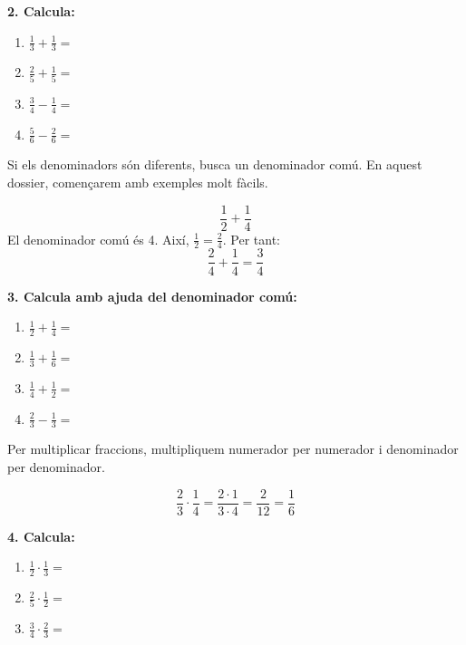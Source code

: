 \documentclass[12pt,a4paper]{article}
\begin{document}
\textbf{2. Calcula:}
\begin{enumerate}[label=\alph*)]
    \item \(\frac{1}{3}+\frac{1}{3}=\) \vspace{0.7cm}
    \item \(\frac{2}{5}+\frac{1}{5}=\) \vspace{0.7cm}
    \item \(\frac{3}{4}-\frac{1}{4}=\) \vspace{0.7cm}
    \item \(\frac{5}{6}-\frac{2}{6}=\) \vspace{0.7cm}
\end{enumerate}

\begin{capsula}
Si els denominadors són diferents, busca un denominador comú. En aquest dossier, començarem amb exemples molt fàcils.
\end{capsula}

\begin{exemple}
\[
\frac{1}{2}+\frac{1}{4}
\]
El denominador comú és 4. Així, \(\frac{1}{2}=\frac{2}{4}\). Per tant:
\[
\frac{2}{4}+\frac{1}{4}=\frac{3}{4}
\]
\end{exemple}

\textbf{3. Calcula amb ajuda del denominador comú:}
\begin{enumerate}[label=\alph*)]
    \item \(\frac{1}{2}+\frac{1}{4}=\) \vspace{0.8cm}
    \item \(\frac{1}{3}+\frac{1}{6}=\) \vspace{0.8cm}
    \item \(\frac{1}{4}+\frac{1}{2}=\) \vspace{0.8cm}
    \item \(\frac{2}{3}-\frac{1}{3}=\) \vspace{0.8cm}
\end{enumerate}

\begin{capsula}
Per multiplicar fraccions, multipliquem numerador per numerador i denominador per denominador.
\end{capsula}

\begin{exemple}
\[
\frac{2}{3}\cdot\frac{1}{4}=\frac{2\cdot1}{3\cdot4}=\frac{2}{12}=\frac{1}{6}
\]
\end{exemple}

\textbf{4. Calcula:}
\begin{enumerate}[label=\alph*)]
    \item \(\frac{1}{2}\cdot\frac{1}{3}=\) \vspace{0.8cm}
    \item \(\frac{2}{5}\cdot\frac{1}{2}=\) \vspace{0.8cm}
    \item \(\frac{3}{4}\cdot\frac{2}{3}=\) \vspace{0.8cm}
\end{enumerate}
\end{document}

